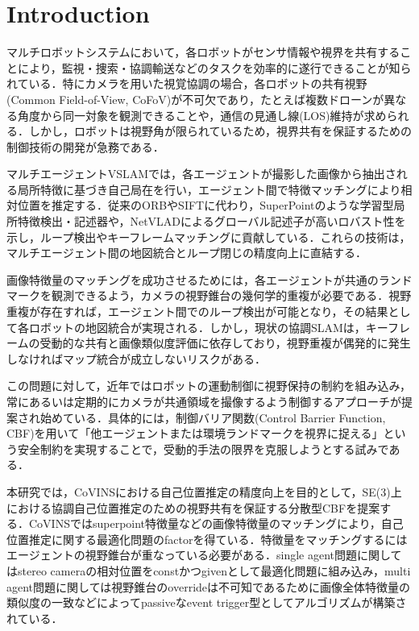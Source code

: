 \section{Introduction}

マルチロボットシステムにおいて，各ロボットがセンサ情報や視界を共有することにより，監視・捜索・協調輸送などのタスクを効率的に遂行できることが知られている．特にカメラを用いた視覚協調の場合，各ロボットの共有視野(Common Field-of-View, CoFoV)が不可欠であり，たとえば複数ドローンが異なる角度から同一対象を観測できることや，通信の見通し線(LOS)維持が求められる\cite{Panagou2017}．しかし，ロボットは視野角が限られているため，視界共有を保証するための制御技術の開発が急務である．

マルチエージェントVSLAMでは，各エージェントが撮影した画像から抽出される局所特徴に基づき自己局在を行い，エージェント間で特徴マッチングにより相対位置を推定する．従来のORBやSIFTに代わり，SuperPointのような学習型局所特徴検出・記述器\cite{DeTone2018}や，NetVLADによるグローバル記述子\cite{Arandjelovic2016}が高いロバスト性を示し，ループ検出やキーフレームマッチングに貢献している．これらの技術は，マルチエージェント間の地図統合とループ閉じの精度向上に直結する．

画像特徴量のマッチングを成功させるためには，各エージェントが共通のランドマークを観測できるよう，カメラの視野錐台の幾何学的重複が必要である．視野重複が存在すれば，エージェント間でのループ検出が可能となり，その結果として各ロボットの地図統合が実現される\cite{Zhang2022}．しかし，現状の協調SLAMは，キーフレームの受動的な共有と画像類似度評価に依存しており，視野重複が偶発的に発生しなければマップ統合が成立しないリスクがある．

この問題に対して，近年ではロボットの運動制御に視野保持の制約を組み込み，常にあるいは定期的にカメラが共通領域を撮像するよう制御するアプローチが提案され始めている．具体的には，制御バリア関数(Control Barrier Function, CBF)を用いて「他エージェントまたは環境ランドマークを視界に捉える」という安全制約を実現することで，受動的手法の限界を克服しようとする試みである\cite{Trimarchi2025}．

本研究では，CoVINSにおける自己位置推定の精度向上を目的として，SE(3)上における協調自己位置推定のための視野共有を保証する分散型CBFを提案する．CoVINSではsuperpoint特徴量などの画像特徴量のマッチングにより，自己位置推定に関する最適化問題のfactorを得ている．特徴量をマッチングするにはエージェントの視野錐台が重なっている必要がある．single agent問題に関してはstereo cameraの相対位置をconstかつgivenとして最適化問題に組み込み，multi agent問題に関しては視野錐台のoverrideは不可知であるために画像全体特徴量の類似度の一致などによってpassiveなevent trigger型としてアルゴリズムが構築されている．

